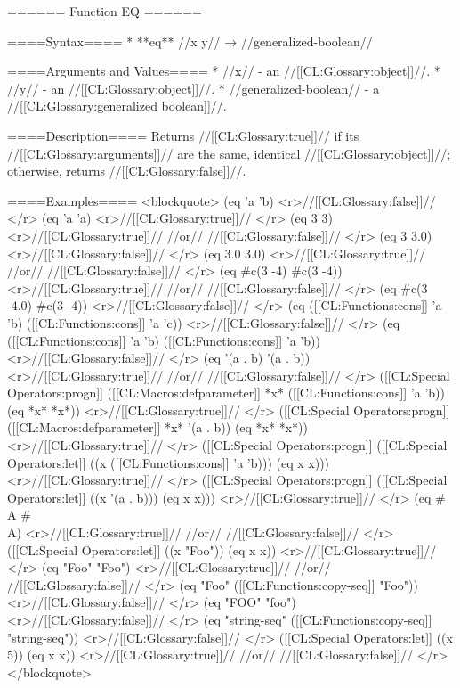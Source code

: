 ====== Function EQ ======

====Syntax====
  * **eq** //x y// → //generalized-boolean//

====Arguments and Values====
  * //x// - an //[[CL:Glossary:object]]//.
  * //y// - an //[[CL:Glossary:object]]//.
  * //generalized-boolean// - a //[[CL:Glossary:generalized boolean]]//.

====Description====
Returns //[[CL:Glossary:true]]// if its //[[CL:Glossary:arguments]]// are the same, identical //[[CL:Glossary:object]]//; otherwise, returns //[[CL:Glossary:false]]//.

====Examples====
<blockquote>
(eq 'a 'b) <r>//[[CL:Glossary:false]]// </r>
(eq 'a 'a) <r>//[[CL:Glossary:true]]// </r>
(eq 3 3) <r>//[[CL:Glossary:true]]// 
//or// //[[CL:Glossary:false]]// </r>
(eq 3 3.0) <r>//[[CL:Glossary:false]]// </r>
(eq 3.0 3.0) <r>//[[CL:Glossary:true]]//
//or// //[[CL:Glossary:false]]// </r>
(eq #c(3 -4) #c(3 -4)) <r>//[[CL:Glossary:true]]//
//or// //[[CL:Glossary:false]]// </r>
(eq #c(3 -4.0) #c(3 -4)) <r>//[[CL:Glossary:false]]// </r>
(eq ([[CL:Functions:cons]] 'a 'b) ([[CL:Functions:cons]] 'a 'c)) <r>//[[CL:Glossary:false]]// </r>
(eq ([[CL:Functions:cons]] 'a 'b) ([[CL:Functions:cons]] 'a 'b)) <r>//[[CL:Glossary:false]]// </r>
(eq '(a . b) '(a . b)) <r>//[[CL:Glossary:true]]//
//or// //[[CL:Glossary:false]]// </r>
([[CL:Special Operators:progn]] ([[CL:Macros:defparameter]] *x* ([[CL:Functions:cons]] 'a 'b)) (eq *x* *x*)) <r>//[[CL:Glossary:true]]// </r>
([[CL:Special Operators:progn]] ([[CL:Macros:defparameter]] *x* '(a . b)) (eq *x* *x*)) <r>//[[CL:Glossary:true]]// </r>
([[CL:Special Operators:progn]] ([[CL:Special Operators:let]] ((x ([[CL:Functions:cons]] 'a 'b))) (eq x x))) <r>//[[CL:Glossary:true]]// </r>
([[CL:Special Operators:progn]] ([[CL:Special Operators:let]] ((x '(a . b))) (eq x x))) <r>//[[CL:Glossary:true]]// </r>
(eq #\\A #\\A) <r>//[[CL:Glossary:true]]//
//or// //[[CL:Glossary:false]]// </r>
([[CL:Special Operators:let]] ((x "Foo")) (eq x x)) <r>//[[CL:Glossary:true]]// </r>
(eq "Foo" "Foo") <r>//[[CL:Glossary:true]]//
//or// //[[CL:Glossary:false]]// </r>
(eq "Foo" ([[CL:Functions:copy-seq]] "Foo")) <r>//[[CL:Glossary:false]]// </r>
(eq "FOO" "foo") <r>//[[CL:Glossary:false]]// </r>
(eq "string-seq" ([[CL:Functions:copy-seq]] "string-seq")) <r>//[[CL:Glossary:false]]// </r>
([[CL:Special Operators:let]] ((x 5)) (eq x x)) <r>//[[CL:Glossary:true]]//
//or// //[[CL:Glossary:false]]// </r>
</blockquote>

